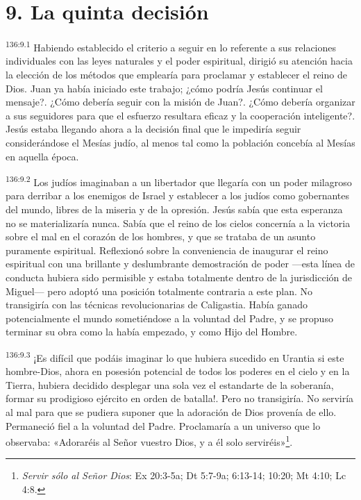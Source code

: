 \section*{9. La quinta decisión}
\par 
\textsuperscript{136:9.1} Habiendo establecido el criterio a seguir en lo referente a sus relaciones individuales con las leyes naturales y el poder espiritual, dirigió su atención hacia la elección de los métodos que emplearía para proclamar y establecer el reino de Dios. Juan ya había iniciado este trabajo; ¿cómo podría Jesús continuar el mensaje?. ¿Cómo debería seguir con la misión de Juan?. ¿Cómo debería organizar a sus seguidores para que el esfuerzo resultara eficaz y la cooperación inteligente?. Jesús estaba llegando ahora a la decisión final que le impediría seguir considerándose el Mesías judío, al menos tal como la población concebía al Mesías en aquella época.

\par 
\textsuperscript{136:9.2} Los judíos imaginaban a un libertador que llegaría con un poder milagroso para derribar a los enemigos de Israel y establecer a los judíos como gobernantes del mundo, libres de la miseria y de la opresión. Jesús sabía que esta esperanza no se materializaría nunca. Sabía que el reino de los cielos concernía a la victoria sobre el mal en el corazón de los hombres, y que se trataba de un asunto puramente espiritual. Reflexionó sobre la conveniencia de inaugurar el reino espiritual con una brillante y deslumbrante demostración de poder ---esta línea de conducta hubiera sido permisible y estaba totalmente dentro de la jurisdicción de Miguel--- pero adoptó una posición totalmente contraria a este plan. No transigiría con las técnicas revolucionarias de Caligastia. Había ganado potencialmente el mundo sometiéndose a la voluntad del Padre, y se propuso terminar su obra como la había empezado, y como Hijo del Hombre.

\par 
\textsuperscript{136:9.3} ¡Es difícil que podáis imaginar lo que hubiera sucedido en Urantia si este hombre-Dios, ahora en posesión potencial de todos los poderes en el cielo y en la Tierra, hubiera decidido desplegar una sola vez el estandarte de la soberanía, formar su prodigioso ejército en orden de batalla!. Pero no transigiría. No serviría al mal para que se pudiera suponer que la adoración de Dios provenía de ello. Permaneció fiel a la voluntad del Padre. Proclamaría a un universo que lo observaba: «Adoraréis al Señor vuestro Dios, y a él solo serviréis»\footnote{\textit{Servir sólo al Señor Dios}: Ex 20:3-5a; Dt 5:7-9a; 6:13-14; 10:20; Mt 4:10; Lc 4:8.}.

